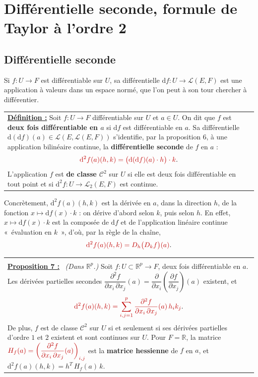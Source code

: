 \documentclass[a4paper,twoside]{report}
\makeatletter
\newcommand{\mot}[1]{\textcolor{rougecours}{\textbf{#1}}}
\newcommand{\rmath}[1]{\textcolor{rougecours}{#1}}
\newenvironment{cadre}%
 {\par\vspace{2mm}\noindent\begin{tabular}{|@{\hspace{4mm}}p{0.93\textwidth}@{\hspace{4mm}}|}
  \hline \\[-2mm]}%
 {\\[2mm] \hline \end{tabular}\par\vspace{3mm}}
\newcommand{\propo}[1]{\textbf{\underline{Proposition #1 :}}~}
\newcommand{\R}{\mathbb{R}}
\newcommand{\dd}{\mathrm{d}}                      %
\newcommand{\tra}[1]{{#1}^{T}}                    %
\newcommand{\Cc}{\mathcal{C}}                     %
\newcommand{\Lc}{\mathcal{L}}                     %
\newcommand{\dpd}[2]{\dfrac{\partial #1}{\partial #2}}  %
\newcommand{\Hs}{H}                               %
\makeatother
\begin{document}
\section[Différentielle seconde]{Différentielle seconde, formule de Taylor à l'ordre 2}

\subsection{Différentielle seconde}

Si $f : U \to F$ est différentiable sur $U$, sa différentielle $\dd f : U \to \Lc(E, F)$ est une application à valeurs dans un espace normé, que l'on peut à son tour chercher à différentier.

\begin{center}
\begin{tabularx}{15cm}{||X}
\noindent \textbf{\underline{Définition :}} Soit $f : U \to F$ différentiable sur $U$ et $a \in U$. On dit que $f$ est \mot{deux fois différentiable en $a$} si $\dd f$ est différentiable en $a$. Sa différentielle $\dd(\dd f)(a) \in \Lc(E, \Lc(E, F))$ s'identifie, par la proposition 6, à une application bilinéaire continue, la \mot{différentielle seconde} de $f$ en $a$ :
\[ \rmath{\dd^{2} f(a)(h, k) = \big(\dd(\dd f)(a)\cdot h\big)\cdot k}. \]
L'application $f$ est \mot{de classe $\Cc^{2}$} sur $U$ si elle est deux fois différentiable en tout point et si $\dd^{2} f : U \to \Lc_{2}(E, F)$ est continue.
\end{tabularx}
\end{center}

\noindent Concrètement, $\dd^{2} f(a)(h, k)$ est la dérivée en $a$, dans la direction $h$, de la fonction $x \mapsto \dd f(x)\cdot k$ : on dérive d'abord selon $k$, puis selon $h$. En effet, $x \mapsto \dd f(x)\cdot k$ est la composée de $\dd f$ et de l'application linéaire continue «~évaluation en $k$~», d'où, par la règle de la chaîne,
\[ \rmath{\dd^{2} f(a)(h, k) = D_{h}\big(D_{k} f\big)(a)}. \]

\begin{cadre}
\propo{7} \emph{(Dans $\R^{p}$.)} Soit $f : U \subset \R^{p} \to F$, deux fois différentiable en $a$. Les dérivées partielles secondes $\dfrac{\partial^{2} f}{\partial x_{i}\,\partial x_{j}}(a) = \dpd{}{x_{i}}\left(\dpd{f}{x_{j}}\right)(a)$ existent, et
\[ \rmath{\dd^{2} f(a)(h, k) = \sum_{i, j = 1}^{p} \frac{\partial^{2} f}{\partial x_{i}\,\partial x_{j}}(a)\,h_{i}k_{j}}. \]
De plus, $f$ est de classe $\Cc^{2}$ sur $U$ si et seulement si ses dérivées partielles d'ordre $1$ et $2$ existent et sont continues sur $U$. Pour $F = \R$, la matrice $\rmath{\Hs_{f}(a) = \left(\dfrac{\partial^{2} f}{\partial x_{i}\,\partial x_{j}}(a)\right)_{i, j}}$ est la \mot{matrice hessienne} de $f$ en $a$, et $\dd^{2} f(a)(h, k) = \tra{h}\,\Hs_{f}(a)\,k$.
\end{cadre}
\end{document}
